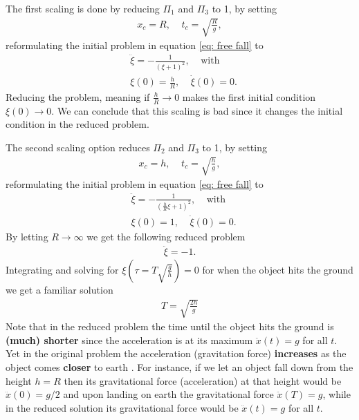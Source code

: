 The first scaling is done by reducing $\Pi_1$ and $\Pi_3$ to 1, by setting
\begin{align}
        x_c = R, \;\;\;\; t_c = \sqrt{\frac{R}{g}},
\end{align}
reformulating the initial problem in equation \ref{eq: free fall} to
\begin{align}
    &\ddot{\xi} = -\frac{1}{(\xi + 1)^2},\;\;\;\;
    \text{with} \nonumber\\
    &\xi(0) = \frac{h}{R}, \;\;\;\; \dot{\xi}(0) = 0.
\end{align}
Reducing the problem, meaning if $\frac{h}{R} \rightarrow 0$ makes the first
initial condition $\xi(0) \rightarrow 0$. We can conclude that this scaling
is bad since it changes the initial condition in the reduced problem.

The second scaling option reduces $\Pi_2$ and $\Pi_3$ to 1, by setting
\begin{align}
        x_c = h, \;\;\;\; t_c = \sqrt{\frac{h}{g}},
\end{align}
reformulating the initial problem in equation \ref{eq: free fall} to
\begin{align}
    &\ddot{\xi} = -\frac{1}{(\frac{h}{R}\xi + 1)^2},\;\;\;\;
    \text{with} \nonumber\\
    &\xi(0) = 1, \;\;\;\; \dot{\xi}(0) = 0.
\end{align}
By letting $R \rightarrow \infty$ we get the following reduced problem
\begin{align}\label{eq: free fall reduced}
    \ddot{\xi} = -1.
\end{align}
Integrating and solving for $\xi(\tau = T\sqrt{\frac{g}{h}}) = 0$ for when the
object hits the ground we get a familiar solution
\begin{align}
    T = \sqrt{\frac{2h}{g}}
\end{align}
Note that in the reduced problem the time until the object hits the ground is
\textbf{(much) shorter} since the acceleration is at its maximum $\ddot{x}(t) =
g$ for all $t$.  Yet in the original problem the acceleration (gravitation
force) \textbf{increases} as the object comes \textbf{closer} to earth . For
instance, if we let an object fall down from the height $h = R$ then its
gravitational force (acceleration) at that height would be $\ddot{x}(0) =
g/2$ and upon landing on earth the gravitational force $\ddot{x}(T) = g$,
while in the reduced solution its gravitational force would be $\ddot{x}(t) =
g$ for all $t$.


